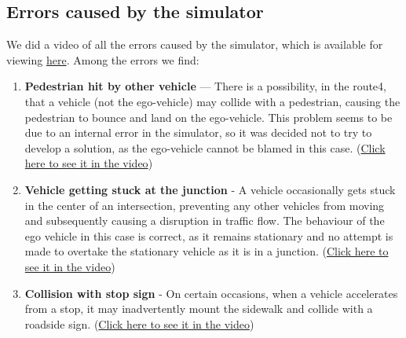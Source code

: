 \documentclass{article}
\begin{document}
\subsection{Errors caused by the simulator}\label{simErr}
We did a video of all the errors caused by the simulator, which is available for viewing \href{https://youtu.be/0O9b3UihDAw}{here}.
Among the errors we find:
\begin{enumerate}
    \item \textbf{Pedestrian hit by other vehicle} — There is a possibility, in the route4, that a vehicle (not the ego-vehicle)
    may collide with a pedestrian, causing the pedestrian to bounce and land on the ego-vehicle. This problem seems to be due to
    an internal error in the simulator, so it was decided not to try to develop a solution, as the ego-vehicle cannot be blamed
    in this case. (\href{https://youtu.be/0O9b3UihDAw?t=11}{Click here to see it in the video})
    \item \textbf{Vehicle getting stuck at the junction} - A vehicle occasionally gets stuck in the center of an intersection,
    preventing any other vehicles from moving and subsequently causing a disruption in traffic flow.
    The behaviour of the ego vehicle in this case is correct, as it remains stationary and no attempt is made to overtake the
    stationary vehicle as it is in a junction. (\href{https://youtu.be/0O9b3UihDAw?t=19}{Click here to see it in the video})
    \item \textbf{Collision with stop sign} - On certain occasions, when a vehicle accelerates from a stop, it may inadvertently
    mount the sidewalk and collide with a roadside sign. (\href{https://youtu.be/0O9b3UihDAw?t=40}{Click here to see it in the video})
\end{enumerate}
\end{document}
